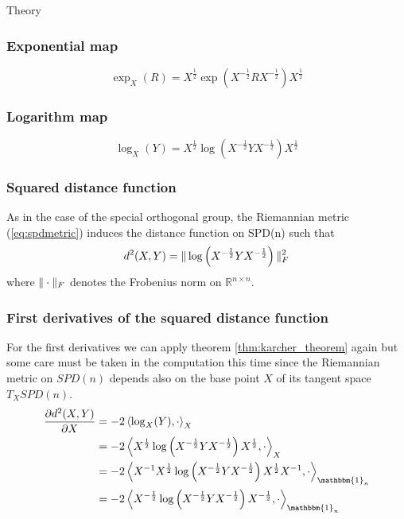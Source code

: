 \begin{chapter}{Theory}
\subsubsection{Exponential map} %
\label{ssub:ExponentialSPD}
\begin{equation}
    \exp_X(R)=X^{\frac{1}{2}}\exp\left(X^{-\frac{1}{2}}RX^{-\frac{1}{2}}\right)X^{\frac{1}{2}}
\end{equation}

\subsubsection{Logarithm map} %
\label{ssub:LogarithmSPD}
\begin{equation}
    \log_X(Y)=X^{\frac{1}{2}}\log\left(X^{-\frac{1}{2}}YX^{-\frac{1}{2}}\right)X^{\frac{1}{2}}
\end{equation}

\subsubsection{Squared distance function} %
\label{ssub:SquareddistanceSPD}
As in the case of the special orthogonal group, the Riemannian metric (\ref{eq:spdmetric}) induces the distance function on SPD(n) such that
\begin{equation}
    d^2(X,Y)=\| \log\left(X^{-\frac{1}{2}}YX^{-\frac{1}{2}}\right) \|_F^2
\end{equation}
where $\| \cdot \|_F$ denotes the Frobenius norm on $\mathbb{R}^{n\times n}$.

\subsubsection{First derivatives of the squared distance function} %
\label{ssub:First derivatives of the squared distance function}
For the first derivatives we can apply theorem \ref{thm:karcher_theorem} again but some care must be taken in the computation this time since the Riemannian metric on $SPD(n)$ depends also on the base point $X$ of its tangent space $T_XSPD(n)$.
\begin{align}
    \frac{\partial d^2(X,Y)}{\partial X} &= -2\braket{\log_X(Y),\cdot}_{X}\\
    &= -2 \braket{X^{\frac{1}{2}}\log\left(X^{-\frac{1}{2}}YX^{-\frac{1}{2}}\right)X^{\frac{1}{2}},\cdot}_{X} \\
    &= -2 \braket{X^{-1}X^{\frac{1}{2}}\log\left(X^{-\frac{1}{2}}YX^{-\frac{1}{2}}\right)X^{\frac{1}{2}}X^{-1},\cdot}_{\mathbbm{1}_n} \\
    &= -2 \braket{X^{-\frac{1}{2}}\log\left( X^{-\frac{1}{2}}YX^{-\frac{1}{2}}\right)X^{-\frac{1}{2}},\cdot}_{\mathbbm{1}_n} 
\end{align}


\end{chapter}

